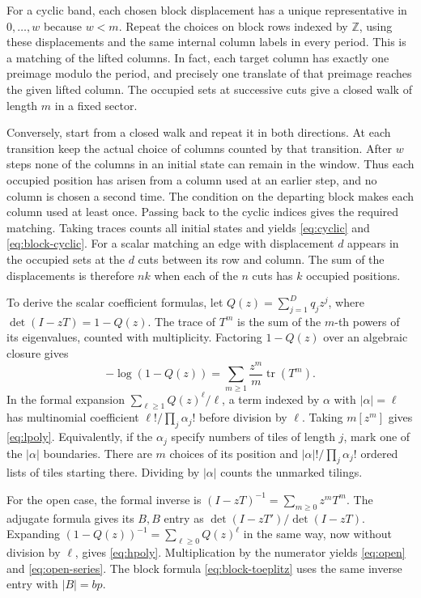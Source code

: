 \documentclass[11pt,reqno]{amsart}
\theoremstyle{remark}
\numberwithin{equation}{section}
\newcommand{\tr}{\operatorname{tr}}
\begin{document}
For a cyclic band, each chosen block displacement has a unique
representative in \(0,\ldots,w\) because \(w<m\). Repeat the choices on
block rows indexed by \(\mathbb Z\), using these displacements and the
same internal column labels in every period. This is a matching of the
lifted columns. In fact, each target column has exactly one preimage
modulo the period, and precisely one translate of that preimage reaches
the given lifted column. The occupied sets at successive cuts give a
closed walk of length \(m\) in a fixed sector.

Conversely, start from a closed walk and repeat it in both directions. At
each transition keep the actual choice of columns counted by that
transition. After \(w\) steps none of the columns in an initial state can
remain in the window. Thus each occupied position has arisen from a
column used at an earlier step, and no column is chosen a second time.
The condition on the departing block makes each column used at least
once. Passing back to the cyclic indices gives the required matching.
Taking traces counts all initial states and yields \eqref{eq:cyclic} and
\eqref{eq:block-cyclic}. For a scalar matching an edge with displacement
\(d\) appears in the occupied sets at the \(d\) cuts between its row and
column. The sum of the displacements is therefore \(nk\) when each of the
\(n\) cuts has \(k\) occupied positions.

To derive the scalar coefficient formulas, let \(Q(z)=\sum_{j=1}^D
q_jz^j\), where \(\det(I-zT)=1-Q(z)\). The trace of \(T^m\) is the sum of
the \(m\)-th powers of its eigenvalues, counted with multiplicity.
Factoring \(1-Q(z)\) over an algebraic closure gives
\[
 -\log(1-Q(z))=\sum_{m\ge1}\frac{z^m}{m}\tr(T^m).
\]
In the formal expansion \(\sum_{\ell\ge1}Q(z)^\ell/\ell\), a term indexed
by \(\alpha\) with \(|\alpha|=\ell\) has multinomial coefficient
\(\ell!/\prod_j\alpha_j!\) before division by \(\ell\). Taking \(m[z^m]\)
gives \eqref{eq:lpoly}. Equivalently, if the \(\alpha_j\) specify numbers
of tiles of length \(j\), mark one of the \(|\alpha|\) boundaries. There
are \(m\) choices of its position and \(|\alpha|!/\prod_j\alpha_j!\)
ordered lists of tiles starting there. Dividing by \(|\alpha|\) counts
the unmarked tilings.

For the open case, the formal inverse is
\((I-zT)^{-1}=\sum_{m\ge0}z^mT^m\). The adjugate formula gives its
\(B,B\) entry as \(\det(I-zT')/\det(I-zT)\). Expanding
\((1-Q(z))^{-1}=\sum_{\ell\ge0}Q(z)^\ell\) in the same way, now without
division by \(\ell\), gives \eqref{eq:hpoly}. Multiplication by the
numerator yields \eqref{eq:open} and \eqref{eq:open-series}. The block
formula \eqref{eq:block-toeplitz} uses the same inverse entry with
\(|B|=bp\).
\end{document}
